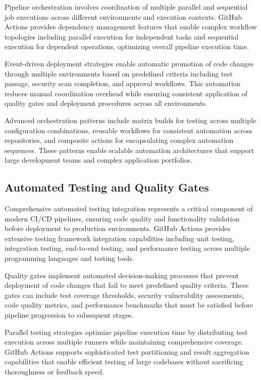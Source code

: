 Pipeline orchestration involves coordination of multiple parallel and sequential job executions across different environments and execution contexts. GitHub Actions provides dependency management features that enable complex workflow topologies including parallel execution for independent tasks and sequential execution for dependent operations, optimizing overall pipeline execution time.

Event-driven deployment strategies enable automatic promotion of code changes through multiple environments based on predefined criteria including test passage, security scan completion, and approval workflows. This automation reduces manual coordination overhead while ensuring consistent application of quality gates and deployment procedures across all environments.

Advanced orchestration patterns include matrix builds for testing across multiple configuration combinations, reusable workflows for consistent automation across repositories, and composite actions for encapsulating complex automation sequences. These patterns enable scalable automation architectures that support large development teams and complex application portfolios.

\subsection{Automated Testing and Quality Gates}

Comprehensive automated testing integration represents a critical component of modern CI/CD pipelines, ensuring code quality and functionality validation before deployment to production environments. GitHub Actions provides extensive testing framework integration capabilities including unit testing, integration testing, end-to-end testing, and performance testing across multiple programming languages and testing tools.

Quality gates implement automated decision-making processes that prevent deployment of code changes that fail to meet predefined quality criteria. These gates can include test coverage thresholds, security vulnerability assessments, code quality metrics, and performance benchmarks that must be satisfied before pipeline progression to subsequent stages.

Parallel testing strategies optimize pipeline execution time by distributing test execution across multiple runners while maintaining comprehensive coverage. GitHub Actions supports sophisticated test partitioning and result aggregation capabilities that enable efficient testing of large codebases without sacrificing thoroughness or feedback speed.

